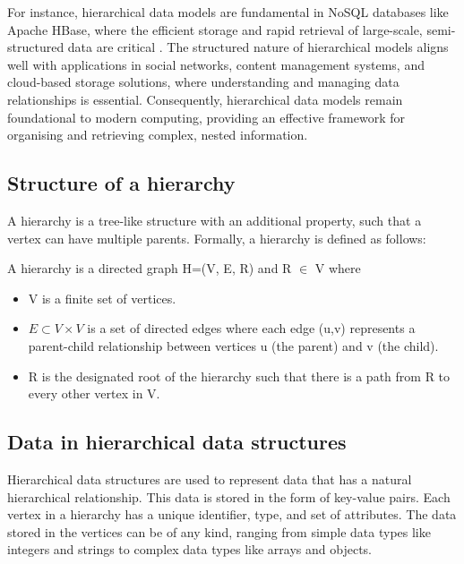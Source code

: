 For instance, hierarchical data models are fundamental in NoSQL databases like Apache HBase, where the efficient storage and rapid retrieval of large-scale, semi-structured data are critical \cite{DBLP:books/daglib/0027893}. The structured nature of hierarchical models aligns well with applications in social networks, content management systems, and cloud-based storage solutions, where understanding and managing data relationships is essential.
Consequently, hierarchical data models remain foundational to modern computing, providing an effective framework for organising and retrieving complex, nested information.

\subsection{Structure of a hierarchy}
A hierarchy is a tree-like structure with an additional property, such that a vertex can have multiple parents.
Formally, a hierarchy is defined as follows:

\begin{definition}
    A hierarchy is a directed graph H=(V, E, R) and R $\in$ V where
    \begin{itemize}
        \item V is a finite set of vertices.
        \item $E \subset V \times V$ is a set of directed edges where each edge (u,v) represents a parent-child relationship between vertices u (the parent) and v (the child).
        \item R is the designated root of the hierarchy such that there is a path from R to every other vertex in V.
        
    \end{itemize} 
\end{definition}

\subsection{Data in hierarchical data structures}

Hierarchical data structures are used to represent data that has a natural hierarchical relationship. This data is stored in the form of key-value pairs. Each vertex in a hierarchy has a unique identifier, type, and set of attributes. The data stored in the vertices can be of any kind, ranging from simple data types like integers and strings to complex data types like arrays and objects. 

